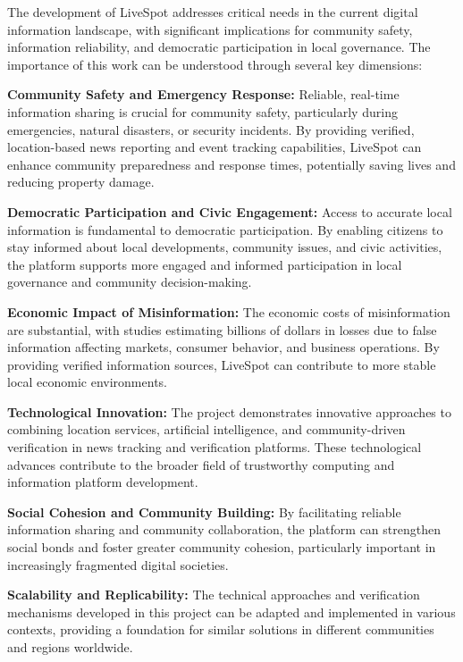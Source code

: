 The development of LiveSpot addresses critical needs in the current digital information landscape, with significant implications for community safety, information reliability, and democratic participation in local governance. The importance of this work can be understood through several key dimensions:

\textbf{Community Safety and Emergency Response:} Reliable, real-time information sharing is crucial for community safety, particularly during emergencies, natural disasters, or security incidents. By providing verified, location-based news reporting and event tracking capabilities, LiveSpot can enhance community preparedness and response times, potentially saving lives and reducing property damage.

\textbf{Democratic Participation and Civic Engagement:} Access to accurate local information is fundamental to democratic participation. By enabling citizens to stay informed about local developments, community issues, and civic activities, the platform supports more engaged and informed participation in local governance and community decision-making.

\textbf{Economic Impact of Misinformation:} The economic costs of misinformation are substantial, with studies estimating billions of dollars in losses due to false information affecting markets, consumer behavior, and business operations. By providing verified information sources, LiveSpot can contribute to more stable local economic environments.

\textbf{Technological Innovation:} The project demonstrates innovative approaches to combining location services, artificial intelligence, and community-driven verification in news tracking and verification platforms. These technological advances contribute to the broader field of trustworthy computing and information platform development.

\textbf{Social Cohesion and Community Building:} By facilitating reliable information sharing and community collaboration, the platform can strengthen social bonds and foster greater community cohesion, particularly important in increasingly fragmented digital societies.

\textbf{Scalability and Replicability:} The technical approaches and verification mechanisms developed in this project can be adapted and implemented in various contexts, providing a foundation for similar solutions in different communities and regions worldwide.
\vfill
